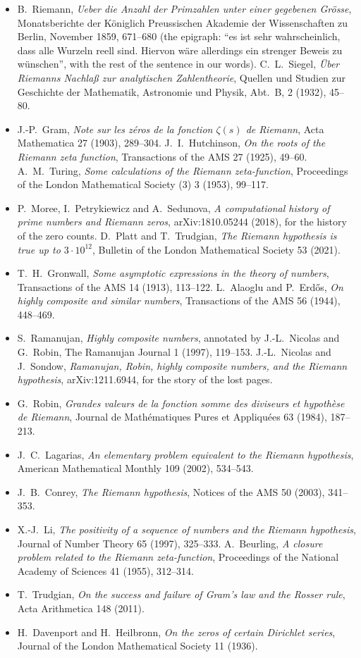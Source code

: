 \begin{itemize}
\item B.~Riemann, \emph{Ueber die Anzahl der Primzahlen unter einer gegebenen Gr\"osse}, Monatsberichte der K\"oniglich Preussischen Akademie der
Wissenschaften zu Berlin, November 1859, 671--680 (the epigraph: ``es ist sehr wahrscheinlich, dass alle Wurzeln reell sind. Hiervon w\"are allerdings
ein strenger Beweis zu w\"unschen'', with the rest of the sentence in our words). C.~L.~Siegel, \emph{\"Uber Riemanns Nachla\ss{} zur analytischen
Zahlentheorie}, Quellen und Studien zur Geschichte der Mathematik, Astronomie und Physik, Abt.~B, 2 (1932), 45--80.
\item J.-P.~Gram, \emph{Note sur les z\'eros de la fonction $\zeta(s)$ de Riemann}, Acta Mathematica 27 (1903), 289--304. J.~I.~Hutchinson, \emph{On the
roots of the Riemann zeta function}, Transactions of the AMS 27 (1925), 49--60. A.~M.~Turing, \emph{Some calculations of the Riemann zeta-function},
Proceedings of the London Mathematical Society (3) 3 (1953), 99--117.
\item P.~Moree, I.~Petrykiewicz and A.~Sedunova, \emph{A computational history of prime numbers and Riemann zeros}, arXiv:1810.05244 (2018), for the
history of the zero counts. D.~Platt and T.~Trudgian, \emph{The Riemann hypothesis is true up to $3\cdot10^{12}$}, Bulletin of the London Mathematical
Society 53 (2021).
\item T.~H.~Gronwall, \emph{Some asymptotic expressions in the theory of numbers}, Transactions of the AMS 14 (1913), 113--122.
L.~Alaoglu and P.~Erd\H{o}s, \emph{On highly composite and similar numbers}, Transactions of the AMS 56 (1944), 448--469.
\item S.~Ramanujan, \emph{Highly composite numbers}, annotated by J.-L.~Nicolas and G.~Robin, The Ramanujan Journal 1 (1997), 119--153. J.-L.~Nicolas and
J.~Sondow, \emph{Ramanujan, Robin, highly composite numbers, and the Riemann hypothesis}, arXiv:1211.6944, for the story of the lost pages.
\item G.~Robin, \emph{Grandes valeurs de la fonction somme des diviseurs et hypoth\`ese de Riemann}, Journal de Math\'ematiques Pures et Appliqu\'ees 63
(1984), 187--213.
\item J.~C.~Lagarias, \emph{An elementary problem equivalent to the Riemann hypothesis}, American Mathematical Monthly 109 (2002), 534--543.
\item J.~B.~Conrey, \emph{The Riemann hypothesis}, Notices of the AMS 50 (2003), 341--353.
\item X.-J.~Li, \emph{The positivity of a sequence of numbers and the Riemann hypothesis}, Journal of Number Theory 65 (1997), 325--333.
A.~Beurling, \emph{A closure problem related to the Riemann zeta-function}, Proceedings of the National Academy of Sciences 41 (1955), 312--314.
\item T.~Trudgian, \emph{On the success and failure of Gram's law and the Rosser rule}, Acta Arithmetica 148 (2011).
\item H.~Davenport and H.~Heilbronn, \emph{On the zeros of certain Dirichlet series}, Journal of the London Mathematical Society 11 (1936).
\end{itemize}
